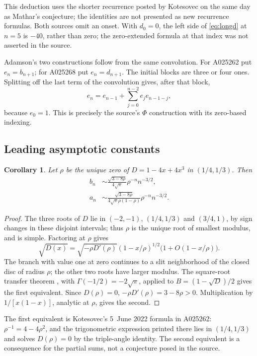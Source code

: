 \documentclass[11pt]{article}
\newtheorem{corollary}[theorem]{Corollary}
\begin{document}
This deduction uses the shorter recurrence posted by Kotesovec on the
same day as Mathar's conjecture; the identities are not presented as
new recurrence formulas. Both sources omit an onset. With $d_0=0$,
the left side of \eqref{eq:longd} at $n=5$ is $-40$, rather than zero;
the zero-extended formula at that index was not asserted in the source.

Adamson's two constructions follow from the same convolution.
For A025262 put $e_n=b_{n+1}$; for A025268 put $e_n=d_{n+1}$.
The initial blocks are three or four ones. Splitting off the last
term of the convolution gives, after that block,
\[
 e_n=e_{n-1}+\sum_{j=0}^{n-2}e_j e_{n-1-j},
\]
because $e_0=1$. This is precisely the source's $\Phi$ construction
with its zero-based indexing.

\subsection{Leading asymptotic constants}

\begin{corollary}\label{cor:asymptotic}
Let $\rho$ be the unique zero of $D=1-4x+4x^3$ in $(1/4,1/3)$.
Then
\begin{equation}\label{eq:asymptotic}
\begin{aligned}
 b_n&\sim\frac{\sqrt{3-8\rho}}{4\sqrt\pi}\rho^{-n}n^{-3/2},\\
 a_n&\sim\frac{\sqrt{3-8\rho}}{4\sqrt\pi\rho(1-\rho)}
                         \rho^{-n}n^{-3/2}.
\end{aligned}
\end{equation}
\end{corollary}
\begin{proof}
The three roots of $D$ lie in $(-2,-1)$, $(1/4,1/3)$ and
$(3/4,1)$, by sign changes in these disjoint intervals; thus
$\rho$ is the unique root of smallest modulus, and is simple.
Factoring at $\rho$ gives
\[
 \sqrt{D(x)}=\sqrt{-\rho D'(\rho)}(1-x/\rho)^{1/2}
                  \bigl(1+O(1-x/\rho)\bigr).
\]
The branch with value one at zero continues to a slit neighborhood
of the closed disc of radius $\rho$; the other two roots have larger
modulus. The square-root transfer theorem
\cite[Theorems~VI.1 and VI.4]{fs}, with
$\Gamma(-1/2)=-2\sqrt\pi$, applied to $B=(1-\sqrt D)/2$
gives the first equivalent. Since $D(\rho)=0$,
$-\rho D'(\rho)=3-8\rho>0$.
Multiplication by $1/[x(1-x)]$, analytic at $\rho$, gives the second.
\end{proof}

The first equivalent is Kotesovec's 5~June 2022 formula in A025262:
$\rho^{-1}=4-4\rho^2$, and the trigonometric expression printed
there lies in $(1/4,1/3)$ and solves $D(\rho)=0$ by the triple-angle
identity. The second equivalent is a consequence for the partial sums,
not a conjecture posed in the source.
\end{document}
